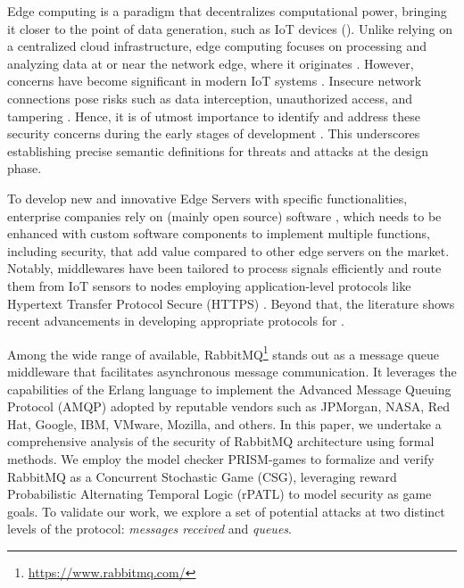 
Edge computing is a paradigm that decentralizes computational power, bringing it closer to the point of data generation, such as IoT devices (). Unlike relying on a centralized cloud infrastructure, edge computing focuses on processing and analyzing data at or near the network edge, where it originates \cite{KHAN2019219}. However,  concerns have become significant in modern IoT systems \cite{baouya2022}. Insecure network connections pose risks such as data interception, unauthorized access, and tampering \cite{Hossein2023}. Hence, it is of utmost importance to identify and address these security concerns during the early stages of development \cite{Valentina2024, Brahim2018}. This underscores establishing precise semantic definitions for threats and attacks at the design phase.


To develop new and innovative Edge Servers with specific functionalities, enterprise companies rely on (mainly open source)  software \cite{ZHANG2021}, which needs to be enhanced with custom software components to implement multiple functions, including security, that add value compared to other edge servers on the market. Notably, middlewares have been tailored to process signals efficiently and route them from IoT sensors to nodes employing application-level protocols like Hypertext Transfer Protocol Secure (HTTPS) \cite{Prasenjit2019}. Beyond that, the literature shows recent advancements in developing appropriate protocols for . 

Among the wide range of  available, RabbitMQ\footnote{\url{https://www.rabbitmq.com/}} stands out as a message queue middleware that facilitates asynchronous message communication. It leverages the capabilities of the Erlang language \cite{armstrong2013programming} to implement the Advanced Message Queuing Protocol (AMQP) adopted by reputable vendors such as JPMorgan, NASA, Red Hat, Google, IBM, VMware, Mozilla, and others.
In this paper, we undertake a comprehensive analysis of the security of RabbitMQ architecture using formal methods. We employ the model checker PRISM-games to formalize and verify RabbitMQ as a Concurrent Stochastic Game (CSG)\cite{kwiatkowskaautomatic2021}, leveraging reward Probabilistic Alternating Temporal Logic (rPATL) \cite{hutchisonautomatic2012} to model security  as game goals. To validate our work, we explore a set of potential attacks at two distinct levels of the protocol:  \emph{messages received} and \emph{queues}.   


